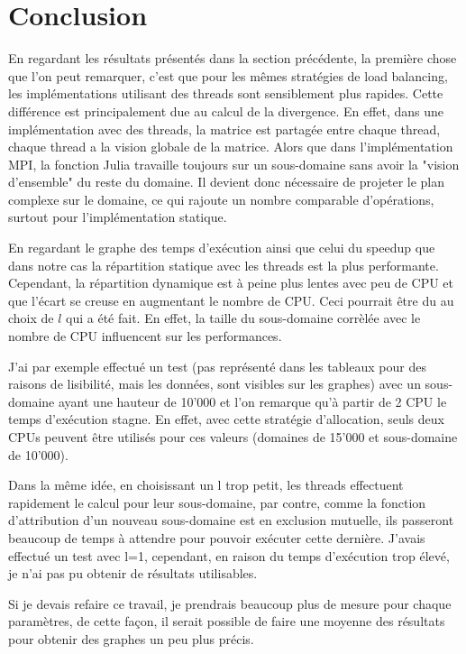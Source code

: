 \documentclass[12pt,a4paper,oneside, titlepage]{report}
\begin{document}
	\section*{Conclusion}

		En regardant les résultats présentés dans la section précédente, la première chose que l'on peut remarquer, c'est que pour les mêmes stratégies de load balancing, les implémentations utilisant des threads sont sensiblement plus rapides.
		Cette différence est principalement due au calcul de la divergence. En effet, dans une implémentation avec des threads, la matrice est partagée entre chaque thread, chaque thread a la vision globale de la matrice. Alors que dans l'implémentation MPI, la fonction Julia travaille toujours sur un sous-domaine sans avoir la "vision d'ensemble" du reste du domaine. Il devient donc nécessaire de projeter le plan complexe sur le domaine, ce qui rajoute un nombre comparable d'opérations, surtout pour l'implémentation statique.

		En regardant le graphe des temps d'exécution ainsi que celui du speedup que dans notre cas la répartition statique avec les threads est la plus performante. Cependant, la répartition dynamique est à peine plus lentes avec peu de CPU et que l'écart se creuse en augmentant le nombre de CPU.
		Ceci pourrait être du au choix de $l$ qui a été fait. En effet, la taille du sous-domaine corrèlée avec le nombre de CPU influencent sur les performances.

		J'ai par exemple effectué un test (pas représenté dans les tableaux pour des raisons de lisibilité, mais les données, sont visibles sur les graphes) avec un sous-domaine ayant une hauteur de 10'000 et l'on remarque qu'à partir de 2 CPU le temps d'exécution stagne. En effet, avec cette stratégie d'allocation, seuls deux CPUs peuvent être utilisés pour ces valeurs (domaines de 15'000 et sous-domaine de 10'000).

		Dans la même idée, en choisissant un l trop petit, les threads effectuent rapidement le calcul pour leur sous-domaine, par contre, comme la fonction d'attribution d'un nouveau sous-domaine est en exclusion mutuelle, ils passeront beaucoup de temps à attendre pour pouvoir exécuter cette dernière. J'avais effectué un test avec l=1, cependant, en raison du temps d'exécution trop élevé, je n'ai pas pu obtenir de résultats utilisables.

		Si je devais refaire ce travail, je prendrais beaucoup plus de mesure pour chaque paramètres, de cette façon, il serait possible de faire une moyenne des résultats pour obtenir des graphes un peu plus précis.
\end{document}
